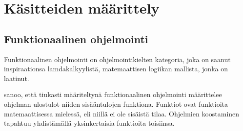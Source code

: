 
\section{Käsitteiden määrittely}\label{kasitteisto}


\subsection{Funktionaalinen ohjelmointi}
Funktionaalinen ohjelmointi on ohjelmointikielten kategoria, joka on saanut inspiraationsa lamdakalkyylistä, matemaattisen logiikan mallista, jonka \citet{church1932set} on laatinut.

\citet{scott2009programming} sanoo, että tiukasti määriteltynä funktionaalinen ohjelmointi määrittelee ohjelman ulostulot niiden sisääntulojen funktiona. Funktiot ovat funktioita matemaattisessa mielessä, eli niillä ei ole sisäistä tilaa. Ohjelmien koostaminen tapahtuu yhdistämällä yksinkertaisia funktioita toisiinsa.

